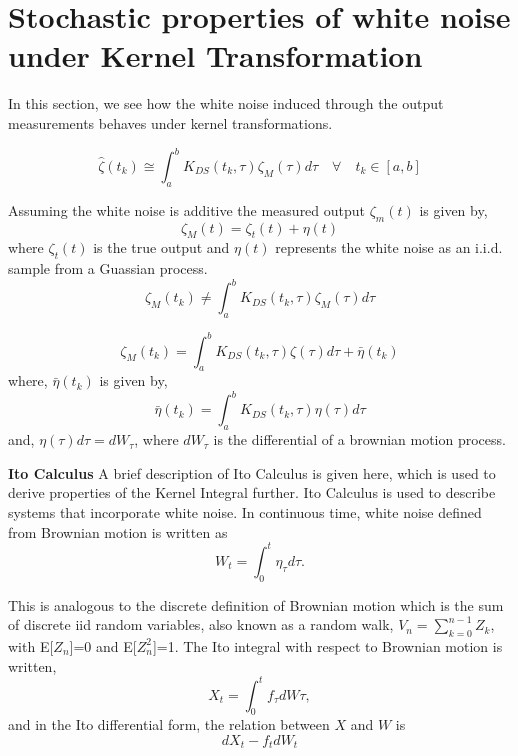 \documentclass[letterpaper%
, twoside%
, 12pt%
,memoire%
, english%
,creativecommons,hyperref%
]{thETS}
\begin{document}
\section{Stochastic properties of white noise under Kernel Transformation} \label{Sec:ThmKdo}
In this section, we see how the white noise induced through the output measurements behaves under kernel transformations.

\begin{equation}
	\hat{\zeta}(t_k) \cong \int_a^b K_{DS}(t_k,\tau) \zeta_M(\tau)d\tau
	\quad \forall\quad t_k \in [a,b]
\end{equation}

Assuming the white noise is additive the measured output $\zeta_m(t)$ is given by, 
\begin{equation}
	\zeta_M(t) = \zeta_t(t) + \eta(t)
\end{equation}
where $\zeta_t(t)$ is the true output and $\eta(t)$ represents the white noise as an i.i.d. sample from a Guassian process. 
\begin{equation}
	\zeta_M(t_k) \neq \int_a^b K_{DS}(t_k,\tau) \zeta_M(\tau)d\tau
\end{equation}

\begin{equation}
	\zeta_M(t_k) = \int_a^b K_{DS}(t_k,\tau) \zeta(\tau)d\tau + \bar{\eta}(t_k)
\end{equation}
where, $\bar{\eta}(t_k)$ is given by, 
\begin{equation}
	\label{eq:kernel_noise}
	\bar{\eta}(t_k) = \int_a^b K_{DS}(t_k,\tau) \eta(\tau)d\tau
\end{equation} 
and, $\eta(\tau)d\tau = dW_\tau$, where $dW_\tau$ is the differential of a brownian motion process. 

\textbf{Ito Calculus}
A brief description of Ito Calculus is given here, which is used to derive properties of the Kernel Integral further. Ito Calculus is used to describe systems that incorporate white noise. In continuous time, white noise defined from Brownian motion is written as 
\begin{equation}
W_t = \int_0^t \eta_\tau d\tau .
\end{equation}

This is analogous to the discrete definition of Brownian motion which is the sum of discrete iid random variables, also known as a random walk, $V_n = \sum_{k=0}^{n-1} Z_k$, with E[$Z_n$]=0 and E[$Z_n^2$]=1. The Ito integral with respect to Brownian motion is written, 
\begin{equation}
X_t = \int_0^t f_\tau dW\tau,
\end{equation} 
and in the Ito differential form, the relation between $X$ and $W$ is 
\begin{equation}
dX_t - f_tdW_t
\end{equation}
\end{document}
